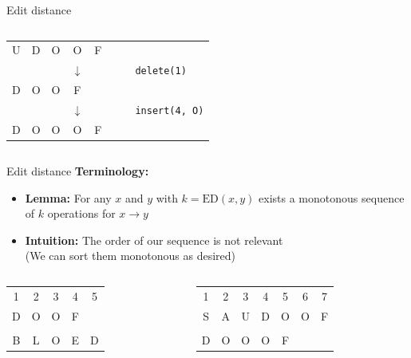 \begin{frame}{Edit distance}
\begin{columns}
\begin{column}{0.5\linewidth}
\begin{center}
\begin{tabular}{c@{}c@{}c@{}c@{}c@{}c@{}cl}
          U & D & O & O & F\\
          {} & {} & {} & $\downarrow$ & {} & {} & {} &
          \texttt{delete({\color{Mittel-Blau}1})}\\
          D & O & O & F\\
          {} & {} & {} & $\downarrow$ & {} & {} & {} &
          \texttt{insert({\color{Mittel-Blau}4}, O)}\\
          D & O & O & O & F
        \end{tabular}
      \end{center}
    \end{column}
  \end{columns}
\end{frame}


\begin{frame}{Edit distance}
  \textbf{Terminology:}
  \begin{itemize}
    \item
      \textbf{Lemma:}
      For any {\color{Mittel-Blau}$x$} and {\color{Mittel-Blau}$y$}
      with $k = \mathrm{ED}(x, y)$ exists a {\color{Mittel-Blau}monotonous}
      sequence of $k$ operations for {\color{Mittel-Blau}$x \rightarrow y$}
    \item
      \textbf{Intuition:}
      The order of our sequence is not relevant\\
      (We can sort them monotonous as desired)
  \end{itemize}
  \begin{columns}[T]
    \begin{column}{0.5\linewidth}
      \begin{center}
        \begin{tabular}{ccccc}
          1 & 2 & 3 & 4 & 5\\
          D & O & O & F\\
          \\
          B & L & O & E & D
        \end{tabular}
      \end{center}
    \end{column}
    \begin{column}{0.5\linewidth}
      \begin{center}
        \begin{tabular}{ccccccc}
          1 & 2 & 3 & 4 & 5 & 6 & 7\\
          S & A & U & D & O & O & F\\
          \\
          D & O & O & O & F
        \end{tabular}
      \end{center}
    \end{column}
  \end{columns}
\end{frame}


